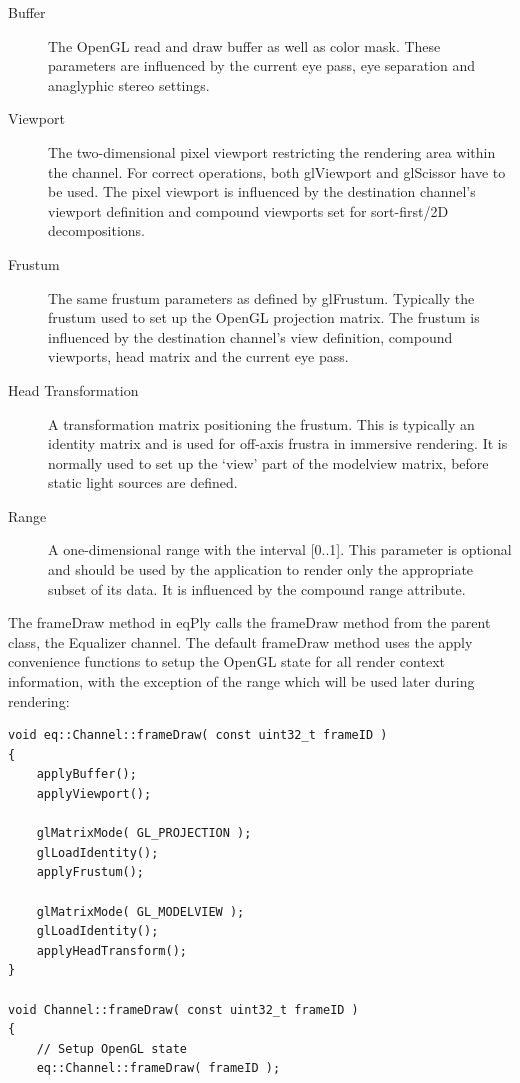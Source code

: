 \documentclass[10pt,a4]{scrartcl}
\begin{document}
\begin{description}
\item[Buffer] The OpenGL read and draw buffer as well as color mask.
  These parameters are influenced by the current eye pass, eye
  separation and anaglyphic stereo settings.
\item[Viewport] The two-dimensional pixel viewport restricting the
  rendering area within the channel. For correct operations, both
  \textsf{glViewport} and \textsf{glScissor} have to be used. The pixel
  viewport is influenced by the destination channel's viewport
  definition and compound viewports set for sort-first/2D decompositions.
\item[Frustum] The same frustum parameters as defined by
  \textsf{glFrustum}. Typically the frustum used to set up the OpenGL
  projection matrix. The frustum is influenced by the destination
  channel's view definition, compound viewports, head matrix and the
  current eye pass.
\item[Head Transformation] A transformation matrix positioning the
  frustum. This is typically an identity matrix and is used for off-axis
  frustra in immersive rendering. It is normally used to set up the
  `view' part of the modelview matrix, before static light sources are
  defined.
\item[Range] A one-dimensional range with the interval [0..1]. This
  parameter is optional and should be used by the application to render
  only the appropriate subset of its data. It is influenced by the
  compound range attribute.
\end{description}

The \textsf{frameDraw} method in \textsf{eqPly} calls the
\textsf{frameDraw} method from the parent class, the Equalizer
channel. The default \textsf{frameDraw} method uses the apply
convenience functions to setup the OpenGL state for all render context
information, with the exception of the range which will be used later
during rendering:

{\footnotesize\begin{lstlisting}
void eq::Channel::frameDraw( const uint32_t frameID )
{
    applyBuffer();
    applyViewport();
    
    glMatrixMode( GL_PROJECTION );
    glLoadIdentity();
    applyFrustum();

    glMatrixMode( GL_MODELVIEW );
    glLoadIdentity();
    applyHeadTransform();
}

void Channel::frameDraw( const uint32_t frameID )
{
    // Setup OpenGL state
    eq::Channel::frameDraw( frameID );
\end{lstlisting}}
\end{document}
